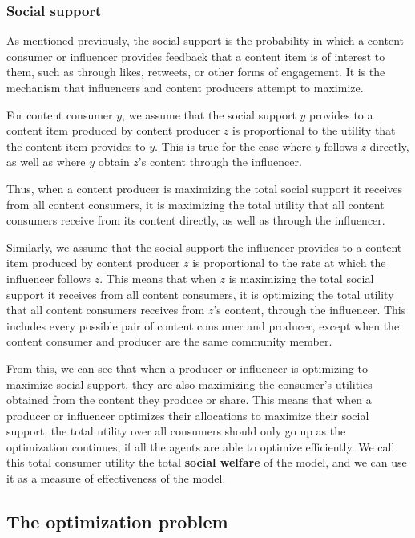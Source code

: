 \documentclass[11pt, letterpaper]{article}
\begin{document}
\subsubsection{Social support}

As mentioned previously, the social support is the probability in which a content consumer or influencer provides feedback that a content item is of interest to them, such as through likes, retweets, or other forms of engagement. It is the mechanism that influencers and content producers attempt to maximize.

For content consumer \(y\), we assume that the social support \(y\) provides to a content item produced by content producer \(z\) is proportional to the utility that the content item provides to \(y\). This is true for the case where \(y\) follows \(z\) directly, as well as where \(y\) obtain \(z\)'s content through the influencer. 

Thus, when a content producer is maximizing the total social support it receives from all content consumers, it is maximizing the total utility that all content consumers receive from its content directly, as well as through the influencer. 

Similarly, we assume that the social support the influencer provides to a content item produced by content producer \(z\) is proportional to the rate at which the influencer follows \(z\). This means that when \(z\) is maximizing the total social support it receives from all content consumers, it is optimizing the total utility that all content consumers receives from \(z\)'s content, through the influencer. This includes every possible pair of content consumer and producer, except when the content consumer and producer are the same community member.

From this, we can see that when a producer or influencer is optimizing to maximize social support, they are also maximizing the consumer's utilities obtained from the content they produce or share. This means that when a producer or influencer optimizes their allocations to maximize their social support, the total utility over all consumers should only go up as the optimization continues, if all the agents are able to optimize efficiently. We call this total consumer utility the total \textbf{social welfare} of the model, and we can use it as a measure of effectiveness of the model.

\subsection{The optimization problem}
\end{document}
